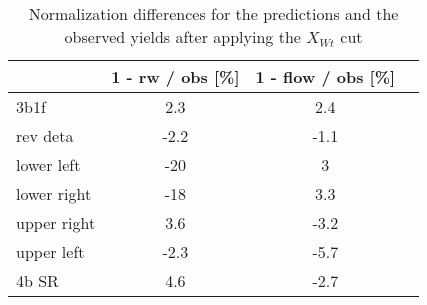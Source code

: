 \begin{table}
\centering
\caption{Normalization differences for the predictions and the observed yields after applying the $X_{Wt}$ cut}
\label{tab:ks_Xwt_cut}
\begin{tabular}{lccc}
\toprule
{} &  1 - rw / obs [\%] &  1 - flow / obs [\%] \\
\midrule
3b1f        &                2.3 &                  2.4 \\
rev deta    &               -2.2 &                 -1.1 \\
lower left  &                -20 &                    3 \\
lower right &                -18 &                  3.3 \\
upper right &                3.6 &                 -3.2 \\
upper left  &               -2.3 &                 -5.7 \\
4b SR       &                4.6 &                 -2.7 \\
\bottomrule
\end{tabular}
\end{table}
